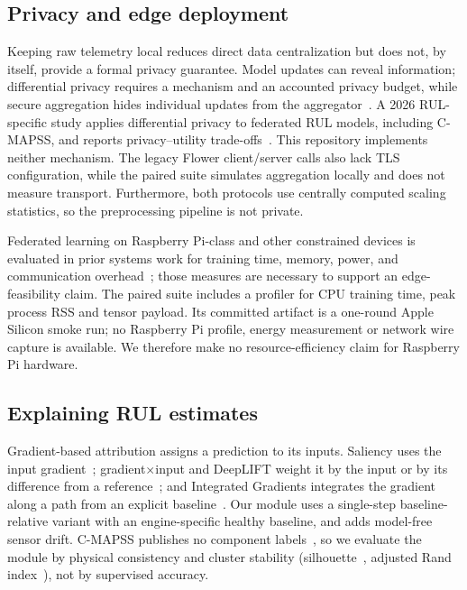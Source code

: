 \subsection{Privacy and edge deployment}
Keeping raw telemetry local reduces direct data centralization but does not, by itself, provide a formal privacy guarantee. Model updates can reveal information; differential privacy requires a mechanism and an accounted privacy budget, while secure aggregation hides individual updates from the aggregator~\cite{abadi2016dpsgd,bonawitz2017secureagg}. A 2026 RUL-specific study applies differential privacy to federated RUL models, including C-MAPSS, and reports privacy--utility trade-offs~\cite{nikulins2026dpRul}. This repository implements neither mechanism. The legacy Flower client/server calls also lack TLS configuration, while the paired suite simulates aggregation locally and does not measure transport. Furthermore, both protocols use centrally computed scaling statistics, so the preprocessing pipeline is not private.

Federated learning on Raspberry Pi-class and other constrained devices is evaluated in prior systems work for training time, memory, power, and communication overhead~\cite{gao2020iotedge,sebbio2023raspberrypi}; those measures are necessary to support an edge-feasibility claim. The paired suite includes a profiler for CPU training time, peak process RSS and tensor payload. Its committed artifact is a one-round Apple Silicon smoke run; no Raspberry Pi profile, energy measurement or network wire capture is available. We therefore make no resource-efficiency claim for Raspberry Pi hardware.

\subsection{Explaining RUL estimates}
Gradient-based attribution assigns a prediction to its inputs. Saliency uses the input gradient~\cite{simonyan2014saliency}; gradient$\times$input and DeepLIFT weight it by the input or by its difference from a reference~\cite{shrikumar2017deeplift}; and Integrated Gradients integrates the gradient along a path from an explicit baseline~\cite{sundararajan2017axiomatic}. Our module uses a single-step baseline-relative variant with an engine-specific healthy baseline, and adds model-free sensor drift. C-MAPSS publishes no component labels~\cite{saxena2008damage}, so we evaluate the module by physical consistency and cluster stability (silhouette~\cite{rousseeuw1987silhouettes}, adjusted Rand index~\cite{hubert1985comparing}), not by supervised accuracy.

